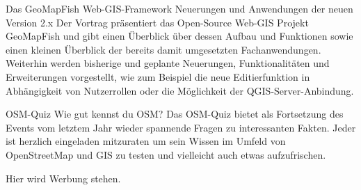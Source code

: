 %
{Das GeoMapFish Web-GIS-Framework}%
{Neuerungen und Anwendungen der neuen Version 2.x}%
{Der Vortrag präsentiert das Open-Source Web-GIS Projekt GeoMapFish und gibt einen Überblick über
dessen Aufbau und Funktionen sowie einen kleinen Überblick der bereits damit umgesetzten
Fachanwendungen. Weiterhin werden bisherige und geplante Neuerungen, Funktionalitäten und
Erweiterungen vorgestellt, wie zum Beispiel die neue Editierfunktion in Abhängigkeit von
Nutzerrollen oder die Möglichkeit der QGIS-Server-Anbindung.}


%
{OSM-Quiz}%
{Wie gut kennst du OSM?}%
{Das OSM-Quiz bietet als Fortsetzung des Events vom letztem Jahr wieder spannende Fragen zu
interessanten Fakten. Jeder ist herzlich eingeladen mitzuraten um sein Wissen im Umfeld von
OpenStreetMap und GIS zu testen und vielleicht auch etwas aufzufrischen.}

\newpage
Hier wird Werbung stehen.

